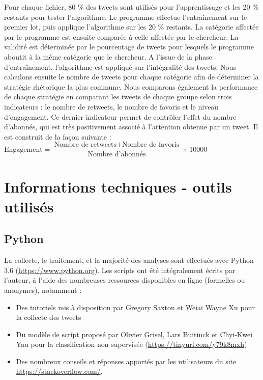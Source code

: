 Pour chaque fichier, 80 \% des tweets sont utilisés pour l’apprentissage et les 20 \% restants pour tester l’algorithme. Le programme effectue l’entraînement sur le premier lot, puis applique l’algorithme sur les 20 \% restants. La catégorie affectée par le programme est ensuite comparée à celle affectée par le chercheur. La validité est déterminée par le pourcentage de tweets pour lesquels le programme aboutit à la même catégorie que le chercheur. A l’issue de la phase d’entraînement, l’algorithme est appliqué sur l’intégralité des tweets.
Nous calculons ensuite le nombre de tweets pour chaque catégorie afin de déterminer la stratégie rhétorique la plus commune. Nous comparons également la performance de chaque stratégie en comparant les tweets de chaque groupe selon trois indicateurs : le nombre de retweets, le nombre de favoris et le niveau d’engagement. Ce dernier indicateur permet de contrôler l’effet du nombre d’abonnés, qui est très positivement associé à l’attention obtenue par un tweet. Il est construit de la façon suivante : \\

$ \text{Engagement} = \dfrac{\text{Nombre de retweets} + \text{Nombre de favoris}}{\text{Nombre d'abonnés}} \times 10000 $

\section{Informations techniques - outils utilisés}

\subsection{Python}
La collecte, le traitement, et la majorité des analyses sont effectués avec Python 3.6 (\url{https://www.python.org}). Les scripts ont été intégralement écrits par l’auteur, à l’aide des nombreuses ressources disponibles en ligne (formelles ou anonymes), notamment :
\begin{itemize}
    \item Des tutoriels mis à disposition par Gregory Saxton et Weiai Wayne Xu pour la collecte des tweets \parencite{saxtonnodatesocial, xunodatesignificant}
    \item Du modèle de script proposé par Olivier Grisel, Lars Buitinck et Chyi-Kwei Yau pour la classification non supervisée (\url{https://tinyurl.com/y79k8mxh})
    \item Des nombreux conseils et réponses apportés par les utilisateurs du site \url{https://stackoverflow.com/}.
\end{itemize}

